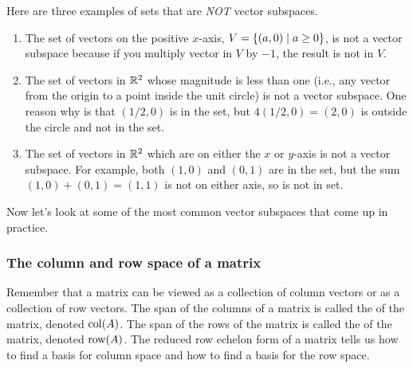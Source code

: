 \begin{example}\label{RR subspace nonexamples}

Here are three examples of sets that are \emph{NOT} vector subspaces.
\begin{enumerate}
	\item The set of vectors on the positive $x$-axis, $V=\{(a,0)\mid a\geq0\}$, is not a vector subspace because if you multiply vector in $V$ by $-1$, the result is not in $V$.
	\item The set of vectors in $\mathbb{R}^2$ whose magnitude is less than one (i.e., any vector from the origin to a point inside the unit circle) is not a vector subspace.  One reason why is that $(1/2,0)$ is in the set, but $4(1/2,0)=(2,0)$ is outside the circle and not in the set.  
	\item The set of vectors in $\mathbb{R}^2$ which are on either the $x$ or $y$-axis is not a vector subspace. For example, both $(1,0)$ and $(0,1)$ are in the set, but the sum $(1,0)+(0,1) = (1,1)$ is not on either axis, so is not in set.
\end{enumerate}
\end{example}

Now let's look at some of the most common vector subspaces that come up in practice.

\subsubsection{The column and row space of a matrix}
Remember that a matrix can be viewed as a collection of column vectors or as a collection of row vectors.  The span of the columns of a matrix is called the  of the matrix, denoted $\operatorname{col}(A)$.  The span of the rows of the matrix is called the  of the matrix, denoted $\operatorname{row}(A)$.  The reduced row echelon form of a matrix tells us how to find a basis for column space and how to find a basis for the row space.  


